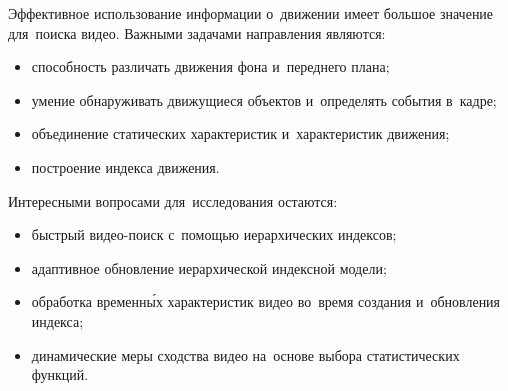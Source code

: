 Эффективное использование информации о~движении имеет большое значение
для~поиска видео. Важными задачами направления являются:
\begin{itemize}
    \item способность различать движения фона и~переднего плана; 
    \item умение обнаруживать движущиеся объектов и~определять события в~кадре;
    \item объединение статических характеристик и~характеристик движения;
    \item построение индекса движения. 
\end{itemize}

Интересными вопросами для~исследования остаются: 
\begin{itemize}
    \item быстрый видео-поиск с~помощью иерархических индексов; 
    \item адаптивное обновление иерархической индексной модели; 
    \item обработка временны́х характеристик видео
        во~время создания и~обновления индекса;
    \item динамические меры сходства видео
        на~основе выбора статистических функций.
\end{itemize}













